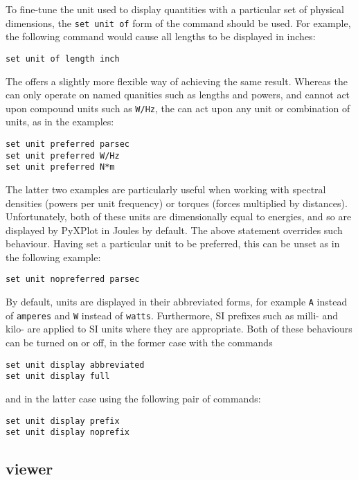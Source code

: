 To fine-tune the unit used to display quantities with a particular set of
physical dimensions, the {\tt set unit of} form of the command should be used.
For example, the following command would cause all lengths to be displayed in
inches:

\begin{verbatim}
set unit of length inch
\end{verbatim}

The  offers a slightly more flexible way of
achieving the same result. Whereas the  can only operate
on named quanities such as lengths and powers, and cannot act upon compound
units such as {\tt W/Hz}, the  can act upon any
unit or combination of units, as in the examples:
\begin{verbatim}
set unit preferred parsec
set unit preferred W/Hz
set unit preferred N*m
\end{verbatim}
The latter two examples are particularly useful when working with spectral
densities (powers per unit frequency) or torques (forces multiplied by
distances). Unfortunately, both of these units are dimensionally equal to
energies, and so are displayed by PyXPlot in Joules by default. The above
statement overrides such behaviour. Having set a particular unit to be
preferred, this can be unset as in the following example:
\begin{verbatim}
set unit nopreferred parsec
\end{verbatim}

By default, units are displayed in their abbreviated forms, for example {\tt A}
instead of {\tt amperes} and {\tt W} instead of {\tt watts}. Furthermore, SI
prefixes such as milli- and kilo- are applied to SI units where they are
appropriate. Both of these behaviours can be turned on or off, in the former
case with the commands

\begin{verbatim}
set unit display abbreviated
set unit display full
\end{verbatim}

\noindent and in the latter case using the following pair of commands:

\begin{verbatim}
set unit display prefix
set unit display noprefix
\end{verbatim}


\subsection{viewer}

